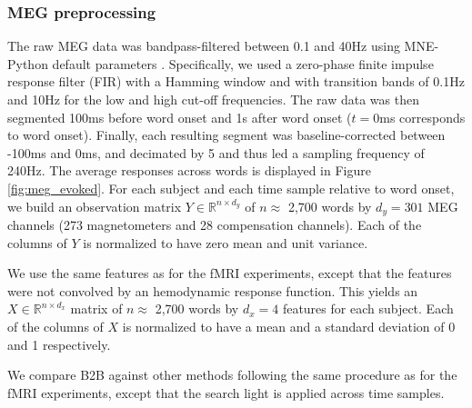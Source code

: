 
\subsubsection{MEG preprocessing}

The raw MEG data was bandpass-filtered between 0.1 and 40Hz using MNE-Python
default parameters \citep{gramfort2013meg, gramfort2014mne}. Specifically, we
used a zero-phase finite impulse
response filter (FIR) with a Hamming window and with transition bands of 0.1Hz
and 10Hz for the low and high cut-off frequencies. The raw data was then
segmented 100ms before word onset and 1s after
word onset ($t=0$ms corresponds to word onset). Finally, each resulting
segment was baseline-corrected between -100ms and 0ms, and decimated by 5 and
thus led a sampling frequency of 240Hz. The average responses across words is
displayed in Figure \ref{fig:meg_evoked}.
For each subject and each time sample relative to word onset, we
build an observation matrix $Y \in \mathbb{R}^{n \times d_y}$ of $n\approx$ 2,700 words
by $d_y=301$ MEG channels (273 magnetometers and 28 compensation channels). Each
of the columns of $Y$ is normalized to have zero mean and unit variance.

We use the same features as for the fMRI experiments, except that the features
were not convolved by an hemodynamic response function. This yields an $X \in \mathbb{R}^{n \times d_x}$
matrix of $n\approx$ 2,700 words by $d_x=4$ features for each subject. Each of
the columns of $X$ is normalized to have a mean and a standard deviation of 0
and 1 respectively.

We compare B2B against other methods following the same procedure as for the
fMRI experiments, except that the search light is applied across time samples.


